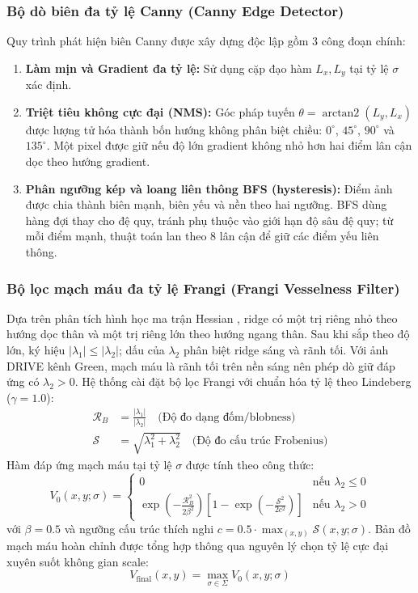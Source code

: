 \documentclass[conference]{IEEEtran}
\begin{document}
\subsubsection{Bộ dò biên đa tỷ lệ Canny (Canny Edge Detector)}
Quy trình phát hiện biên Canny \cite{canny1986computational} được xây dựng độc lập gồm 3 công đoạn chính:
\begin{enumerate}
    \item \textbf{Làm mịn và Gradient đa tỷ lệ:} Sử dụng cặp đạo hàm $L_x, L_y$ tại tỷ lệ $\sigma$ xác định.
    \item \textbf{Triệt tiêu không cực đại (NMS):} Góc pháp tuyến $\theta = \operatorname{arctan2}(L_y, L_x)$ được lượng tử hóa thành bốn hướng không phân biệt chiều: $0^\circ$, $45^\circ$, $90^\circ$ và $135^\circ$. Một pixel được giữ nếu độ lớn gradient không nhỏ hơn hai điểm lân cận dọc theo hướng gradient.
    \item \textbf{Phân ngưỡng kép và loang liên thông BFS (hysteresis):} Điểm ảnh được chia thành biên mạnh, biên yếu và nền theo hai ngưỡng. BFS dùng hàng đợi thay cho đệ quy, tránh phụ thuộc vào giới hạn độ sâu đệ quy; từ mỗi điểm mạnh, thuật toán lan theo 8 lân cận để giữ các điểm yếu liên thông.
\end{enumerate}

\subsubsection{Bộ lọc mạch máu đa tỷ lệ Frangi (Frangi Vesselness Filter)}
Dựa trên phân tích hình học ma trận Hessian \cite{frangi1998multiscale}, ridge có một trị riêng nhỏ theo hướng dọc thân và một trị riêng lớn theo hướng ngang thân. Sau khi sắp theo độ lớn, ký hiệu $|\lambda_1|\leq|\lambda_2|$; dấu của $\lambda_2$ phân biệt ridge sáng và rãnh tối. Với ảnh DRIVE kênh Green, mạch máu là rãnh tối trên nền sáng nên phép dò giữ đáp ứng có $\lambda_2>0$.
Hệ thống cài đặt bộ lọc Frangi với chuẩn hóa tỷ lệ theo Lindeberg \cite{lindeberg1998feature} ($\gamma = 1.0$):
\begin{align}
\mathcal{R}_B &= \frac{|\lambda_1|}{|\lambda_2|} \quad \text{(Độ đo dạng đốm/blobness)} \\
\mathcal{S} &= \sqrt{\lambda_1^2 + \lambda_2^2} \quad \text{(Độ đo cấu trúc Frobenius)}
\end{align}
Hàm đáp ứng mạch máu tại tỷ lệ $\sigma$ được tính theo công thức:
\begin{equation}
V_0(x, y; \sigma) = \begin{cases}
    0 & \text{nếu } \lambda_2 \leq 0 \\
    \exp\left(-\frac{\mathcal{R}_B^2}{2\beta^2}\right) \left[ 1 - \exp\left(-\frac{\mathcal{S}^2}{2c^2}\right) \right] & \text{nếu } \lambda_2 > 0
\end{cases}
\end{equation}
với $\beta = 0.5$ và ngưỡng cấu trúc thích nghi $c = 0.5 \cdot \max_{(x,y)} \mathcal{S}(x, y; \sigma)$.
Bản đồ mạch máu hoàn chỉnh được tổng hợp thông qua nguyên lý chọn tỷ lệ cực đại xuyên suốt không gian scale:
\begin{equation}
V_{\text{final}}(x, y) = \max_{\sigma \in \Sigma} V_0(x, y; \sigma)
\end{equation}
\end{document}
